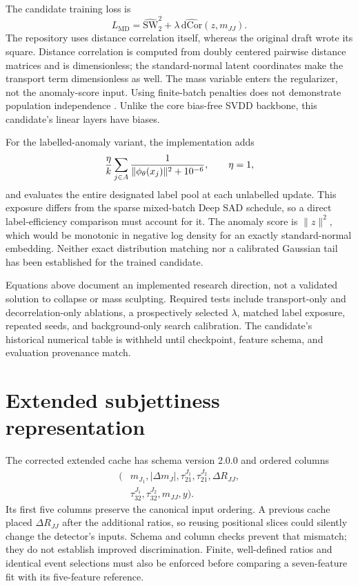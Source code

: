 \documentclass[reprint,aps,pra,amsmath,amssymb,floatfix,raggedbottom]{revtex4-2}
\newcommand{\mjj}{m_{JJ}}
\begin{document}
The candidate training loss is
\begin{equation}\label{eq:mdswad}
 L_{\mathrm{MD}}=\widehat{\mathrm{SW}}_2^2+
 \lambda\,\widehat{\mathrm{dCor}}(z,\mjj).
\end{equation}
The repository uses distance correlation itself, whereas the original draft wrote its square. Distance correlation is computed from doubly centered pairwise distance matrices and is dimensionless; the standard-normal latent coordinates make the transport term dimensionless as well. The mass variable enters the regularizer, not the anomaly-score input. Using finite-batch penalties does not demonstrate population independence \cite{disco}. Unlike the core bias-free SVDD backbone, this candidate's linear layers have biases.

For the labelled-anomaly variant, the implementation adds
\begin{equation}
 {\eta\over k}\sum_{j\in A}{1\over\|\phi_\theta(x_j)\|^2+10^{-6}},
 \qquad \eta=1,
\end{equation}
and evaluates the entire designated label pool at each unlabelled update. This exposure differs from the sparse mixed-batch Deep SAD schedule, so a direct label-efficiency comparison must account for it. The anomaly score is $\|z\|^2$, which would be monotonic in negative log density for an exactly standard-normal embedding. Neither exact distribution matching nor a calibrated Gaussian tail has been established for the trained candidate.

Equations above document an implemented research direction, not a validated solution to collapse or mass sculpting. Required tests include transport-only and decorrelation-only ablations, a prospectively selected $\lambda$, matched label exposure, repeated seeds, and background-only search calibration. The candidate's historical numerical table is withheld until checkpoint, feature schema, and evaluation provenance match.

\section{Extended subjettiness representation}\label{app:extended}
The corrected extended cache has schema version 2.0.0 and ordered columns
\begin{align*}
 (&m_{J_1},|\Delta m_J|,\tau_{21}^{J_1},\tau_{21}^{J_2},\Delta R_{JJ},\\
  &\tau_{32}^{J_1},\tau_{32}^{J_2},\mjj,y).
\end{align*}
Its first five columns preserve the canonical input ordering. A previous cache placed $\Delta R_{JJ}$ after the additional ratios, so reusing positional slices could silently change the detector's inputs. Schema and column checks prevent that mismatch; they do not establish improved discrimination. Finite, well-defined ratios and identical event selections must also be enforced before comparing a seven-feature fit with its five-feature reference.
\end{document}
